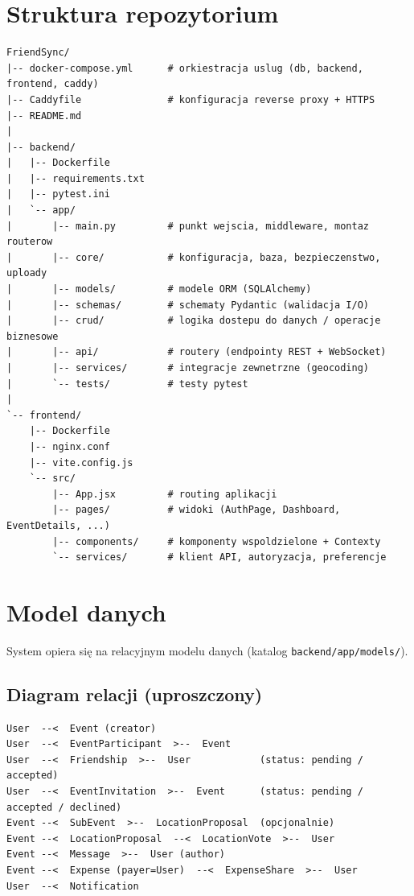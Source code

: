 \documentclass[11pt,a4paper]{article}
\begin{document}
\section{Struktura repozytorium}

\begin{lstlisting}[language={}]
FriendSync/
|-- docker-compose.yml      # orkiestracja uslug (db, backend, frontend, caddy)
|-- Caddyfile               # konfiguracja reverse proxy + HTTPS
|-- README.md
|
|-- backend/
|   |-- Dockerfile
|   |-- requirements.txt
|   |-- pytest.ini
|   `-- app/
|       |-- main.py         # punkt wejscia, middleware, montaz routerow
|       |-- core/           # konfiguracja, baza, bezpieczenstwo, uploady
|       |-- models/         # modele ORM (SQLAlchemy)
|       |-- schemas/        # schematy Pydantic (walidacja I/O)
|       |-- crud/           # logika dostepu do danych / operacje biznesowe
|       |-- api/            # routery (endpointy REST + WebSocket)
|       |-- services/       # integracje zewnetrzne (geocoding)
|       `-- tests/          # testy pytest
|
`-- frontend/
    |-- Dockerfile
    |-- nginx.conf
    |-- vite.config.js
    `-- src/
        |-- App.jsx         # routing aplikacji
        |-- pages/          # widoki (AuthPage, Dashboard, EventDetails, ...)
        |-- components/     # komponenty wspoldzielone + Contexty
        `-- services/       # klient API, autoryzacja, preferencje
\end{lstlisting}

\section{Model danych}

System opiera się na relacyjnym modelu danych (katalog \texttt{backend/app/models/}).

\subsection{Diagram relacji (uproszczony)}

\begin{lstlisting}[language={}]
User  --<  Event (creator)
User  --<  EventParticipant  >--  Event
User  --<  Friendship  >--  User            (status: pending / accepted)
User  --<  EventInvitation  >--  Event      (status: pending / accepted / declined)
Event --<  SubEvent  >--  LocationProposal  (opcjonalnie)
Event --<  LocationProposal  --<  LocationVote  >--  User
Event --<  Message  >--  User (author)
Event --<  Expense (payer=User)  --<  ExpenseShare  >--  User
User  --<  Notification
\end{lstlisting}
\end{document}
